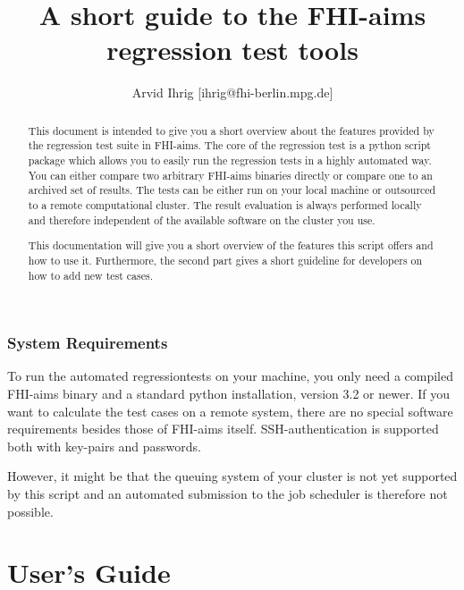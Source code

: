 \documentclass[a4paper,12pt]{scrartcl}
\title{A short guide to the FHI-aims regression test tools}
\author{Arvid Ihrig [ihrig@fhi-berlin.mpg.de]}
\begin{document}
\maketitle

\begin{abstract}
This document is intended to give you a short overview about the features provided by the regression test suite in
FHI-aims. The core of the regression test is a python script package which allows you to easily run the regression
tests in a highly automated way. You can either compare two arbitrary FHI-aims binaries directly or compare one to
an archived set of results. The tests can be either run on your local machine or outsourced to a remote computational
cluster. The result evaluation is always performed locally and therefore independent of the available software on the
cluster you use.

This documentation will give you a short overview of the features this script offers and how to use it. Furthermore,
the second part gives a short guideline for developers on how to add new test cases.
\end{abstract}
\section*{System Requirements}
To run the automated regressiontests on your machine, you only need a compiled FHI-aims binary and a standard python
installation, version 3.2 or newer. If you want to calculate the test cases on a remote system, there are no special
software requirements besides those of FHI-aims itself. SSH-authentication is supported both with key-pairs and
passwords.

However, it might be that the queuing system of your cluster is not yet supported by this script and an automated
submission to the job scheduler is therefore not possible.

\newpage
\part{User's Guide}
\end{document}
